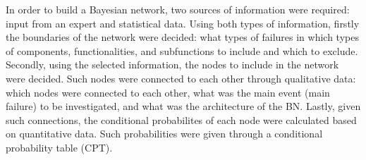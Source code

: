 In order to build a Bayesian network, two sources of information were required: input from an expert and statistical data. Using both types of information, firstly the boundaries of the network were decided: what types of failures in which types of components, functionalities, and subfunctions to include and which to exclude. Secondly, using the selected information, the nodes to include in the network were decided. Such nodes were connected to each other through qualitative data: which nodes were connected to each other, what was the main event (main failure) to be investigated, and what was the architecture of the BN. Lastly, given such connections, the conditional probabilites of each node were calculated based on quantitative data. Such probabilities were given through a conditional probability table (CPT).